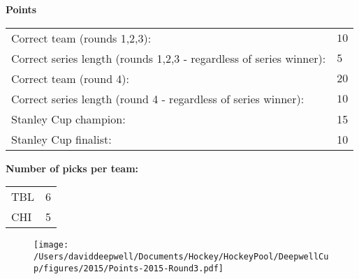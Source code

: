\documentclass[10pt]{article}
\begin{document}
{\bf Points}\\
\begin{minipage}{12cm}
    \begin{tabular}{l l}
        Correct team (rounds 1,2,3):	& $10$\\
        Correct series length (rounds 1,2,3 - regardless of series winner):	& $5$\\
        Correct team (round 4):	& $20$\\
        Correct series length (round 4 - regardless of series winner):	& $10$\\
        Stanley Cup champion:	& 15\\
        Stanley Cup finalist:	& 10\\
    \end{tabular}

    \vspace{1cm}
    {\bf Number of picks per team:}\\
    \begin{tabular}{lc }
        TBL & 6 \\
        CHI & 5 \\
    \end{tabular}
\end{minipage}
\begin{minipage}[t]{13cm}
    \begin{figure}[H]
        \vspace{-2.5cm}
        \texttt{[image: /Users/daviddeepwell/Documents/Hockey/HockeyPool/DeepwellCup/figures/2015/Points-2015-Round3.pdf]}
    \end{figure}
\end{minipage}
\end{document}
